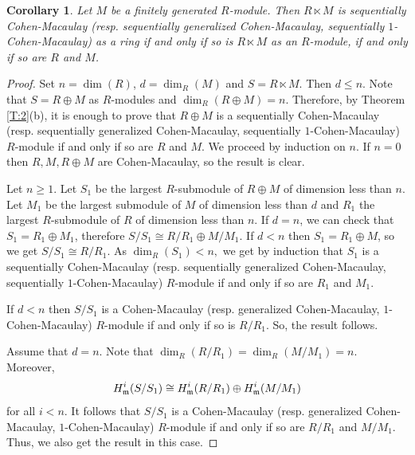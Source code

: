 \documentclass[10pt,a4paper]{amsart}
\newtheorem{corollary}{Corollary}
\begin{document}
\begin{corollary} \label{C:2} Let $M$ be a finitely generated $R$-module. Then $R\ltimes M$ is sequentially  Cohen-Macaulay (resp. sequentially  generalized Cohen-Macaulay, sequentially  $1$-Cohen-Macaulay) as a ring  if and only if  so is $R\ltimes M$ as an $R$-module, if and only if so are $R$ and $M$.  
\end{corollary}

\begin{proof}  	Set $n=\dim (R)$, $d=\dim_R(M)$ and $S=R\ltimes M$. Then $d\leq n.$ Note that $S=R\oplus M$ as $R$-modules and $\dim_R(R\oplus M)=n$. Therefore, by Theorem \ref{T:2}(b), it is enough to prove that $R\oplus M$ is a sequentially  Cohen-Macaulay (resp. sequentially  generalized Cohen-Macaulay, sequentially  $1$-Cohen-Macaulay)  $R$-module if and only if so are $R$ and $M$. We  proceed by induction on $n$. If  $n=0$ then $R, M, R\oplus M$ are Cohen-Macaulay, so the result  is clear. 
		
Let $n\geq 1.$ Let $S_1$ be the largest $R$-submodule of $R\oplus M$ of dimension less than $n$.  Let $M_1$ be the largest submodule of $M$  of dimension less than $d$ and  $R_1$ the largest $R$-submodule of $R$  of dimension less than $n$.  If $d=n$, we can check that $S_1=R_1\oplus M_1$, therefore $S/S_1\cong R/R_1\oplus M/M_1$. If $d<n$ then $S_1=R_1\oplus M$, so we get   $S/S_1\cong R/R_1$. As $\dim_R(S_1)<n,$ we get by induction that $S_1$ is a sequentially  Cohen-Macaulay (resp. sequentially  generalized Cohen-Macaulay, sequentially  $1$-Cohen-Macaulay) $R$-module if and only if so are $R_1$ and $M_1$. 
		
If $d<n$ then $S/S_1$ is a Cohen-Macaulay (resp. generalized Cohen-Macaulay, $1$-Cohen-Macaulay) $R$-module if and only if so is  $R/R_1$.  So, the result follows.	
		
Assume that $d=n$. Note that $\dim_R(R/R_1)=\dim_R(M/M_1)=n$. Moreover, $$H_{\frak m}^i(S/S_1)\cong H^i_{\frak m}(R/R_1)\oplus H^i_{\frak m}(M/M_1)$$ for all $i<n$. It follows that $S/S_1$ is a Cohen-Macaulay (resp. generalized Cohen-Macaulay, $1$-Cohen-Macaulay) $R$-module if and only if so are $R/R_1$ and $M/M_1$. Thus, we also get the result in this case. 		
\end{proof}
\end{document}
